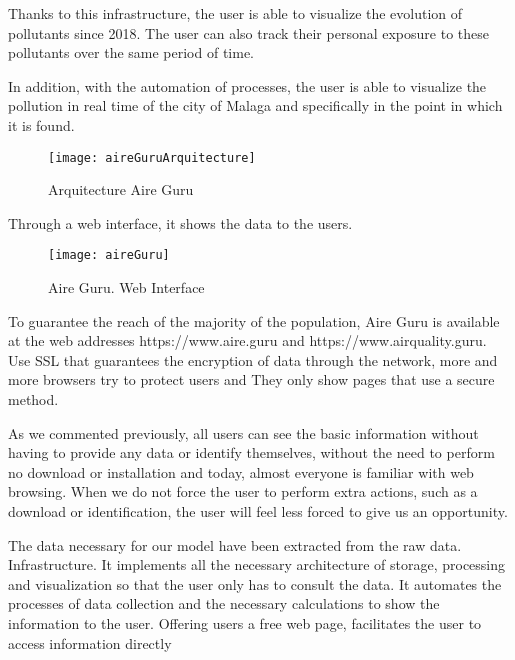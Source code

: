 Thanks to this infrastructure, the user is able to visualize the evolution of pollutants since 2018. The user can also track their personal exposure
 to these pollutants over the same period of time.

In addition, with the automation of processes, the user is able to visualize the pollution in real time of the city of Malaga and specifically in the point
in which it is found. \\

\begin{figure}[ht]
    \centering
    \texttt{[image: aireGuruArquitecture]}
    \caption{Arquitecture Aire Guru}
\end{figure}

Through a web interface, it shows the data to the users. \\

\begin{figure}[ht]
    \centering
    \texttt{[image: aireGuru]}
    \caption{Aire Guru. Web Interface}
\end{figure}

To guarantee the reach of the majority of the population, Aire Guru is available at the web addresses https://www.aire.guru and https://www.airquality.guru.
Use SSL that guarantees the encryption of data through the network, more and more browsers try to protect users and
They only show pages that use a secure method.

As we commented previously, all users can see the basic information without having to provide any data or identify themselves, without the need to
perform no download or installation and today, almost everyone is familiar with web browsing.
When we do not force the user to perform extra actions, such as a download or identification, the user will feel less forced to give us an opportunity.


\begin{itemize}
\done The data necessary for our model have been extracted from the raw data.
\done Infrastructure. It implements all the necessary architecture of storage, processing and visualization so that the user only has to consult
the data.
\done It automates the processes of data collection and the necessary calculations to show the information to the user.
\done Offering users a free web page, facilitates the user to access information directly
\end{itemize}


